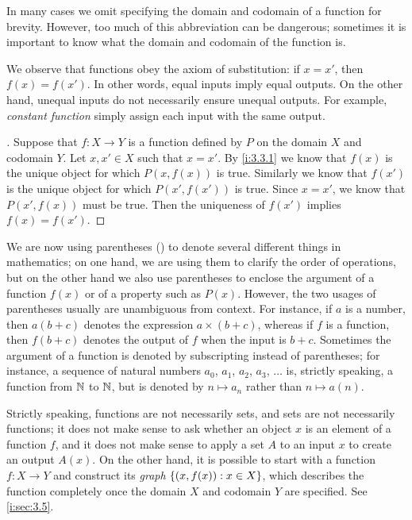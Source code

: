 \begin{note}
  In many cases we omit specifying the domain and codomain of a function for brevity.
  However, too much of this abbreviation can be dangerous;
  sometimes it is important to know what the domain and codomain of the function is.
\end{note}

\begin{ac}\label{i:ac:3.3.1}
  We observe that functions obey the axiom of substitution:
  if \(x = x'\), then \(f(x) = f(x')\).
  In other words, equal inputs imply equal outputs.
  On the other hand, unequal inputs do not necessarily ensure unequal outputs.
  For example, \emph{constant function} simply assign each input with the same output.
\end{ac}

\begin{proof}[]
  Suppose that \(f : X \to Y\) is a function defined by \(P\) on the domain \(X\) and codomain \(Y\).
  Let \(x, x' \in X\) such that \(x = x'\).
  By \cref{i:3.3.1} we know that \(f(x)\) is the unique object for which \(P(x, f(x))\) is true.
  Similarly we know that \(f(x')\) is the unique object for which \(P(x', f(x'))\) is true.
  Since \(x = x'\), we know that \(P(x', f(x))\) must be true.
  Then the uniqueness of \(f(x')\) implies \(f(x) = f(x')\).
\end{proof}

\setcounter{thm}{4}
\begin{rmk}\label{i:3.3.5}
  We are now using parentheses () to denote several different things in mathematics;
  on one hand, we are using them to clarify the order of operations, but on the other hand we also use parentheses to enclose the argument of a function \(f(x)\) or of a property such as \(P(x)\).
  However, the two usages of parentheses usually are unambiguous from context.
  For instance, if \(a\) is a number, then \(a(b + c)\) denotes the expression \(a \times (b + c)\), whereas if \(f\) is a function, then \(f(b + c)\) denotes the output of \(f\) when the input is \(b + c\).
  Sometimes the argument of a function is denoted by subscripting instead of parentheses;
  for instance, a sequence of natural numbers \(a_0\), \(a_1\), \(a_2\), \(a_3\), \(\dots\) is, strictly speaking, a function from \(\mathbb{N}\) to \(\mathbb{N}\), but is denoted by \(n \mapsto a_n\) rather than \(n \mapsto a(n)\).
\end{rmk}

\begin{rmk}\label{i:3.3.6}
  Strictly speaking, functions are not necessarily sets, and sets are not necessarily functions;
  it does not make sense to ask whether an object \(x\) is an element of a function \(f\), and it does not make sense to apply a set \(A\) to an input \(x\) to create an output \(A(x)\).
  On the other hand, it is possible to start with a function \(f : X \to Y\) and construct its \emph{graph} \(\left\lbrace(x, f(x)) : x \in X\right\rbrace\), which describes the function completely once the domain \(X\) and codomain \(Y\) are specified.
  See \cref{i:sec:3.5}.
\end{rmk}

